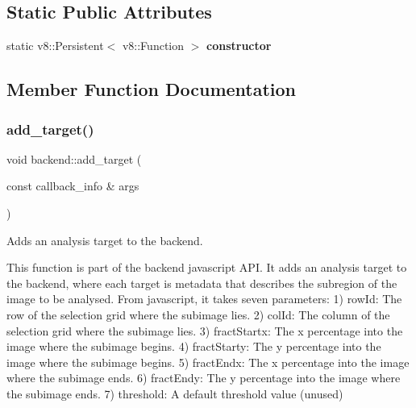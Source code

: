 \subsection*{Static Public Attributes}
\begin{DoxyCompactItemize}
\item 
\mbox{\label{classbackend_a2e36e089be85fa5fcdec6d9ab50c3199}} 
static v8\+::\+Persistent$<$ v8\+::\+Function $>$ {\bfseries constructor}
\end{DoxyCompactItemize}


\subsection{Member Function Documentation}
\mbox{\label{classbackend_ac981fabc3077c133dca35b5cb7e6f66c}} 
\subsubsection{\texorpdfstring{add\+\_\+target()}{add\_target()}}
{\footnotesize\ttfamily void backend\+::add\+\_\+target (\begin{DoxyParamCaption}\item[{const callback\+\_\+info \&}]{args }\end{DoxyParamCaption})\hspace{0.3cm}{\ttfamily [static]}}



Adds an analysis target to the backend. 

This function is part of the backend javascript A\+PI. It adds an analysis target to the backend, where each target is metadata that describes the subregion of the image to be analysed. From javascript, it takes seven parameters\+: 1) row\+Id\+: The row of the selection grid where the subimage lies. 2) col\+Id\+: The column of the selection grid where the subimage lies. 3) fract\+Startx\+: The x percentage into the image where the subimage begins. 4) fract\+Starty\+: The y percentage into the image where the subimage begins. 5) fract\+Endx\+: The x percentage into the image where the subimage ends. 6) fract\+Endy\+: The y percentage into the image where the subimage ends. 7) threshold\+: A default threshold value (unused) \mbox{\label{classbackend_a9e8157df648d308880c4ec62adc426fb}} 
